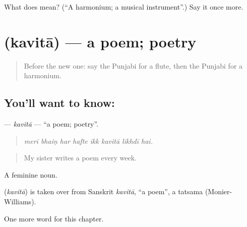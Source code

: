 \begin{tcolorbox}[breakable,colback=teal!4,colframe=teal!35!black,title={Before you move on}]
What does  mean? (\textquotedblleft{}A harmonium; a musical instrument\textquotedblright{}.) Say it once more.
\end{tcolorbox}
\section[\texorpdfstring{\pa{ਕਵਿਤਾ} (kavitā)}{ਕਵਿਤਾ (kavitā)}]{ (kavitā) — a poem; poetry}

\label{lesson:PA-C349-kavita}



\begin{quote}
Before the new one: say the Punjabi for a flute, then the Punjabi for a harmonium.
\end{quote}

\subsection*{You'll want to know: }
\textbf{} — \emph{kavitā} — \textquotedblleft{}a poem; poetry\textquotedblright{}.

\begin{quote}
       
\end{quote}

\begin{quote}
\emph{merī bhaiṇ har hafte ikk kavitā likhdī hai.}
\end{quote}

\begin{quote}
My sister writes a poem every week.
\end{quote}

A feminine noun.

\begin{cousinweb}
\textbf{} (\emph{kavitā}) is taken over from Sanskrit \emph{kavitā}, \textquotedblleft{}a poem\textquotedblright{}, a tatsama (Monier-Williams).
\end{cousinweb}

\begin{grammarlens}[title={What you've built}]
One more word for this chapter.
\end{grammarlens}

